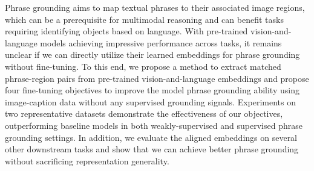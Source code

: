 Phrase grounding aims to map textual phrases to their associated image regions, which can be a prerequisite for multimodal reasoning and can benefit tasks requiring identifying objects based on language. With pre-trained vision-and-language models achieving impressive performance across tasks, it remains unclear if we can directly utilize their learned embeddings for phrase grounding without fine-tuning. To this end, we propose a method to extract matched phrase-region pairs from pre-trained vision-and-language embeddings and propose four fine-tuning objectives to improve the model phrase grounding ability using image-caption data without any supervised grounding signals. Experiments on two representative datasets demonstrate the effectiveness of our objectives, outperforming baseline models in both weakly-supervised and supervised phrase grounding settings. In addition, we evaluate the aligned embeddings on several other downstream tasks and show that we can achieve better phrase grounding without sacrificing representation generality.
